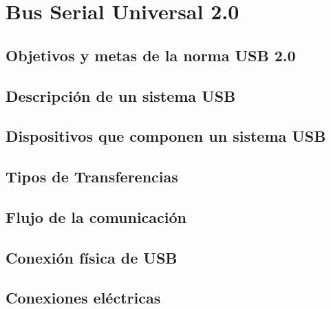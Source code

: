 \chapter{Bus Serial Universal 2.0}
	\label{cap:usb}
	
		\section{Objetivos y metas de la norma USB 2.0}
			\label{usb:ov}
			
		\section{Descripción de un sistema USB}
			\label{usb:desc}
			
		\section{Dispositivos que componen un sistema USB}
			\label{usb:disp}
			
		\section{Tipos de Transferencias}
			\label{usb:xfer}
			
		\section{Flujo de la comunicación}
		\section{Conexión física de USB}
			\label{usb:fis}
			
		\section{Conexiones eléctricas}
